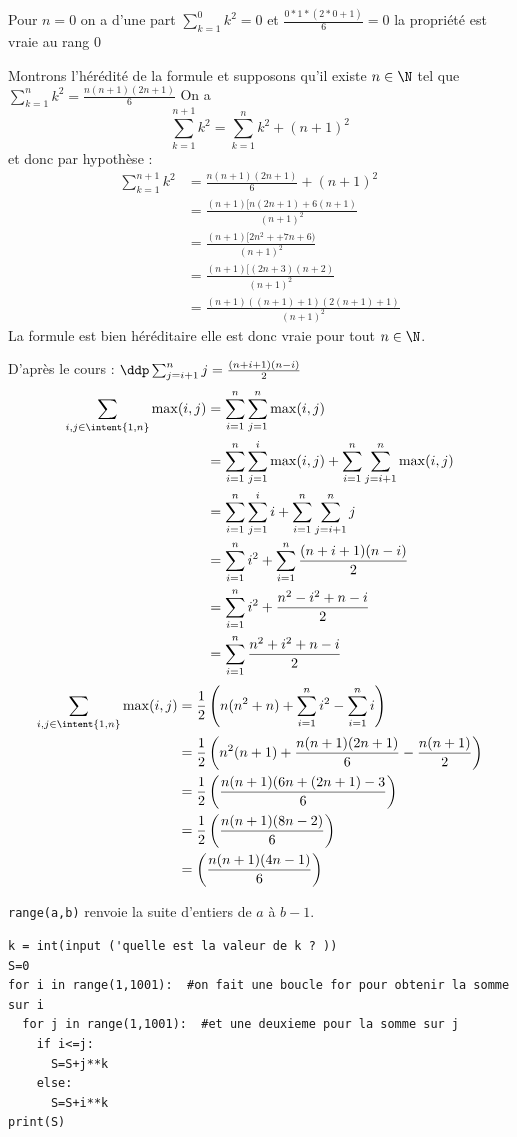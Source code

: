 \begin{correction}
Pour $n=0 $ on a d'une part $\sum_{k=1}^0 k^2 =0$ et 
$\frac{0*1*(2*0+1)}{6}=0$ la propriété est vraie au rang 0

Montrons l'hérédité de la formule et supposons qu'il existe $n\in \N$ tel que $ \sum_{k=1}^n  k^2= \frac{n(n+1)(2n+1)}{6}$
On a 
$$\sum_{k=1}^{n+1} k^2 =\sum_{k=1}^{n} k^2 +  (n+1)^2$$
et donc par hypothèse : 
\begin{align*}
\sum_{k=1}^{n+1} k^2 &=\frac{n(n+1)(2n+1)}{6} +  (n+1)^2\\
									&= \frac{(n+1) [ n(2n+1) +6(n+1)}{(n+1)^2}\\
									&= \frac{(n+1) [ 2n^2+ +7n+6)}{(n+1)^2}		\\												&= \frac{(n+1) [ (2n+3)(n+2)}{(n+1)^2}				\\											&= \frac{(n+1) ((n+1)+1) (2(n+1)+1)}{(n+1)^2}			
\end{align*}
La formule est  bien héréditaire elle est donc vraie pour tout $n\in \N$. 



D'après le cours :
$\ddp \sum_{j=i+1}^n j = \frac{(n+i+1)(n-i)}{2}$
\begin{align*}
\sum_{i,j \in \intent{1,n}} \max(i,j) &= \sum_{i=1}^n \sum_{j=1}^n\max(i,j)\\
												&= \sum_{i=1}^n \sum_{j=1}^i\max(i,j) + \sum_{i=1}^n \sum_{j=i+1}^n\max(i,j)\\
												&= \sum_{i=1}^n \sum_{j=1}^i i  + \sum_{i=1}^n \sum_{j=i+1}^n j\\
													&= \sum_{i=1}^n i^2+ \sum_{i=1}^n \frac{(n+i+1)(n-i)}{2} \\
													&= \sum_{i=1}^n i^2 + \frac{n^2-i^2 +n-i}{2}\\		
													&= \sum_{i=1}^n \frac{n^2+i^2 +n-i}{2}\\	
\end{align*}
\begin{align*}
\sum_{i,j \in \intent{1,n}} \max(i,j)	&= \frac{1}{2} \left( n (n^2+n) + \sum_{i=1}^n i^2  -  \sum_{i=1}^n i\right)\\
													&= \frac{1}{2} \left(  n^2 (n+1) +  \frac{n(n+1)(2n+1)}{6} -   \frac{n(n+1)}{2}\right)\\
													&=\frac{1}{2} \left(   \frac{n(n+1)(6n +(2n+1) -3 }{6} \right)\\
													&=\frac{1}{2} \left(   \frac{n(n+1)(8n-2)}{6} \right)\\		
													&= \left(   \frac{n(n+1)(4n-1)}{6} \right)											
\end{align*}

\texttt{range(a,b)} renvoie la suite d'entiers de $a$ à $b-1$. 


\begin{lstlisting}
k = int(input ('quelle est la valeur de k ? ))
S=0
for i in range(1,1001):  #on fait une boucle for pour obtenir la somme sur i 
  for j in range(1,1001):  #et une deuxieme pour la somme sur j
    if i<=j:
      S=S+j**k
    else:
      S=S+i**k
print(S)
\end{lstlisting}


\end{correction}




